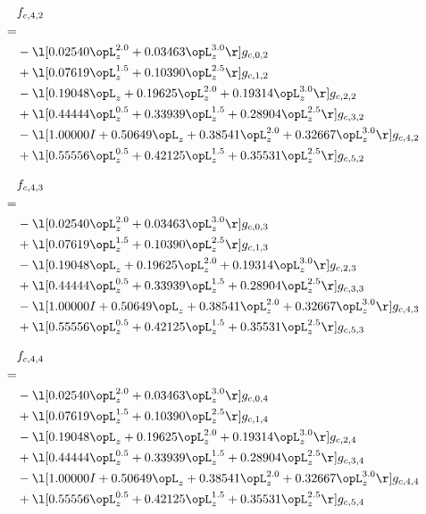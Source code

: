 \begin{alignat}{2} 
\label{eq:f_42_0} 
& f_{c,4,2} \nonumber \\ 
 = \\ 
& - \l[  0.02540 \opL_z^{2.0} +  0.03463 \opL_z^{3.0}  \r] g_{c,0,2} \nonumber \\ 
& + \l[  0.07619 \opL_z^{1.5} +  0.10390 \opL_z^{2.5}  \r] g_{c,1,2} \nonumber \\ 
& - \l[  0.19048 \opL_z +  0.19625 \opL_z^{2.0} +  0.19314 \opL_z^{3.0}  \r] g_{c,2,2} \nonumber \\ 
& + \l[  0.44444 \opL_z^{0.5} +  0.33939 \opL_z^{1.5} +  0.28904 \opL_z^{2.5}  \r] g_{c,3,2} \nonumber \\ 
& - \l[  1.00000 I +  0.50649 \opL_z +  0.38541 \opL_z^{2.0} +  0.32667 \opL_z^{3.0}  \r] g_{c,4,2} \nonumber \\ 
& + \l[  0.55556 \opL_z^{0.5} +  0.42125 \opL_z^{1.5} +  0.35531 \opL_z^{2.5}  \r] g_{c,5,2} \nonumber \\ 
\end{alignat} 


\begin{alignat}{2} 
\label{eq:f_43_0} 
& f_{c,4,3} \nonumber \\ 
 = \\ 
& - \l[  0.02540 \opL_z^{2.0} +  0.03463 \opL_z^{3.0}  \r] g_{c,0,3} \nonumber \\ 
& + \l[  0.07619 \opL_z^{1.5} +  0.10390 \opL_z^{2.5}  \r] g_{c,1,3} \nonumber \\ 
& - \l[  0.19048 \opL_z +  0.19625 \opL_z^{2.0} +  0.19314 \opL_z^{3.0}  \r] g_{c,2,3} \nonumber \\ 
& + \l[  0.44444 \opL_z^{0.5} +  0.33939 \opL_z^{1.5} +  0.28904 \opL_z^{2.5}  \r] g_{c,3,3} \nonumber \\ 
& - \l[  1.00000 I +  0.50649 \opL_z +  0.38541 \opL_z^{2.0} +  0.32667 \opL_z^{3.0}  \r] g_{c,4,3} \nonumber \\ 
& + \l[  0.55556 \opL_z^{0.5} +  0.42125 \opL_z^{1.5} +  0.35531 \opL_z^{2.5}  \r] g_{c,5,3} \nonumber \\ 
\end{alignat} 


\begin{alignat}{2} 
\label{eq:f_44_0} 
& f_{c,4,4} \nonumber \\ 
 = \\ 
& - \l[  0.02540 \opL_z^{2.0} +  0.03463 \opL_z^{3.0}  \r] g_{c,0,4} \nonumber \\ 
& + \l[  0.07619 \opL_z^{1.5} +  0.10390 \opL_z^{2.5}  \r] g_{c,1,4} \nonumber \\ 
& - \l[  0.19048 \opL_z +  0.19625 \opL_z^{2.0} +  0.19314 \opL_z^{3.0}  \r] g_{c,2,4} \nonumber \\ 
& + \l[  0.44444 \opL_z^{0.5} +  0.33939 \opL_z^{1.5} +  0.28904 \opL_z^{2.5}  \r] g_{c,3,4} \nonumber \\ 
& - \l[  1.00000 I +  0.50649 \opL_z +  0.38541 \opL_z^{2.0} +  0.32667 \opL_z^{3.0}  \r] g_{c,4,4} \nonumber \\ 
& + \l[  0.55556 \opL_z^{0.5} +  0.42125 \opL_z^{1.5} +  0.35531 \opL_z^{2.5}  \r] g_{c,5,4} \nonumber \\ 
\end{alignat} 


